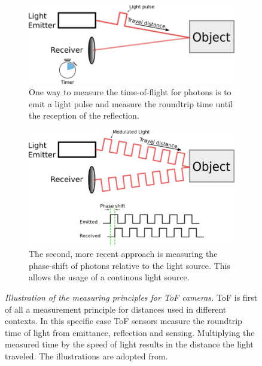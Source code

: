 \begin{figure}[b!]
    \centering
    \begin{subfigure}[t]{0.45\textwidth}
        \includegraphics[width=\textwidth]{chapter03/img/tof_traveltime_original.png}
        \caption{One way to measure the time-of-flight for photons is to emit a light pulse and measure the roundtrip time until the reception of the reflection.}\label{fig:tof_roundtrip}
    \end{subfigure}\quad
    \begin{subfigure}[t]{0.45\textwidth}
        \includegraphics[width=\textwidth]{chapter03/img/tof_phase_shift_original.png}
        \caption{The second, more recent approach is measuring the phase-shift of photons relative to the light source. This allows the usage of a continous light source.}\label{fig:tof_phase_shift}
    \end{subfigure}
    \caption[Illustration of the measuring principles for \acrshort{ToF} cameras]{\emph{Illustration of the measuring principles for \acrshort{ToF} cameras.} \acrlong{ToF} is first of all a measurement principle for distances used in different contexts. In this specific case \acrshort{ToF} sensors measure the roundtrip time of light from emittance, reflection and sensing. Multiplying the measured time by the speed of light results in the distance the light traveled. The illustrations are adopted from\cite{tof_cameras}.}\label{fig:tof_illustration}
\end{figure}
